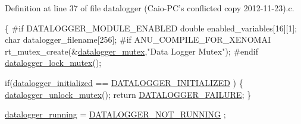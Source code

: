 Definition at line 37 of file datalogger (\-Caio-\/\-P\-C's conflicted copy 2012-\/11-\/23).\-c.


\begin{DoxyCode}
\{
\textcolor{preprocessor}{    #if DATALOGGER\_MODULE\_ENABLED}
\textcolor{preprocessor}{}    \textcolor{keywordtype}{double} enabled\_variables[16][1];
    \textcolor{keywordtype}{char} datalogger\_filename[256];
\textcolor{preprocessor}{        #if ANU\_COMPILE\_FOR\_XENOMAI}
\textcolor{preprocessor}{}    rt\_mutex\_create(&\hyperlink{datalogger_01_07Caio-PC's_01conflicted_01copy_012012-11-23_08_8c_a824d6f7fd1d3898ba0b1100ba37875c6}{datalogger\_mutex},\textcolor{stringliteral}{"Data Logger Mutex"});
\textcolor{preprocessor}{        #endif}
\textcolor{preprocessor}{}    \hyperlink{datalogger_01_07Caio-PC's_01conflicted_01copy_012012-11-23_08_8c_a54b06d9395b2e370a5a72beb7f9524b2}{datalogger\_lock\_mutex}();

    \textcolor{keywordflow}{if}(\hyperlink{datalogger_01_07Caio-PC's_01conflicted_01copy_012012-11-23_08_8c_a35e8fbe04b90452afdc3c1be16ff6187}{datalogger\_initialized} == \hyperlink{datalogger_01_07Caio-PC's_01conflicted_01copy_012012-11-23_08_8h_a684c343d340004b77ca2b782934c96ca}{DATALOGGER\_INITIALIZED}
      )
    \{
        \hyperlink{datalogger_01_07Caio-PC's_01conflicted_01copy_012012-11-23_08_8c_a85453211c0c809083c36cc56b275aeeb}{datalogger\_unlock\_mutex}();
        \textcolor{keywordflow}{return} \hyperlink{datalogger_01_07Caio-PC's_01conflicted_01copy_012012-11-23_08_8h_ac52138ca42979f6e1f1d589020ff9f83}{DATALOGGER\_FAILURE};
    \}

    \hyperlink{datalogger_01_07Caio-PC's_01conflicted_01copy_012012-11-23_08_8c_a185c3ede96449d14f330fe5ac664e799}{datalogger\_running} = \hyperlink{datalogger_01_07Caio-PC's_01conflicted_01copy_012012-11-23_08_8h_a1a224da36800f52f56f30619849f7f5d}{DATALOGGER\_NOT\_RUNNING}
      ;


\end{DoxyCode}
